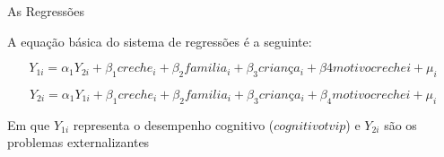 \documentclass[10pt]{Beamer}
\begin{document}
\begin{frame}{As Regressões}	

\begin{itemize}

\begin{block}
	
\item A equação básica do sistema de regressões é a seguinte: 

\end{block}

\end{itemize}

\begin{equation}
Y_{1i} = \alpha_1Y_{2i} + \beta_1creche_i + \beta_2familia_i + \beta_3criança_i + \beta4motivocrechei + \mu_i
\end{equation}

\begin{equation}
Y_{2i} = \alpha_1Y_{1i} + \beta_1creche_i + \beta_2familia_i + \beta_3criança_i + \beta_4motivocrechei + \mu_i
\end{equation}

\begin{tcolorbox}[drop fuzzy shadow=ShadowColor]
Em que $Y_{1i}$ representa o desempenho cognitivo ($cognitivo tvip$) e $Y_{2i}$ são os problemas externalizantes
\end{tcolorbox}

\end{frame}
	
\end{document}
